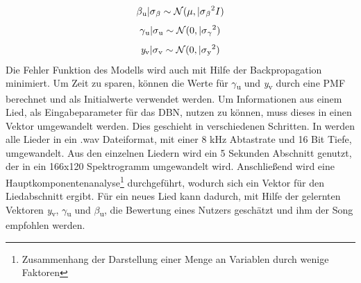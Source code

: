 \documentclass[twosided,a4,10pt]{article}
\begin{document}
\begin{multicols}{2}
		\begin{equation*}
		\centering
		\beta\textsubscript{u}|\sigma\textsubscript{$\beta$}\sim\mathcal{N}(\mu,|\sigma\textsubscript{$\beta$}\textsuperscript{2}I)
		\end{equation*}
		\begin{equation*}
		\centering
		\gamma\textsubscript{u}|\sigma\textsubscript{u}\sim\mathcal{N}(0,|\sigma\textsubscript{$\gamma$}\textsuperscript{2})
		\end{equation*}
		\begin{equation*}
		\centering
		\textit{y}\textsubscript{v}|\sigma\textsubscript{v}\sim\mathcal{N}(0,|\sigma\textsubscript{y}\textsuperscript{2})
		\end{equation*}\newline
		Die Fehler Funktion des Modells wird auch mit Hilfe der Backpropagation minimiert. Um Zeit zu sparen, können die Werte für $\gamma$\textsubscript{u} und \textit{y}\textsubscript{v} durch eine PMF berechnet und als Initialwerte verwendet werden.\newline
		Um Informationen aus einem Lied, als Eingabeparameter für das DBN, nutzen zu können, muss dieses in einen Vektor umgewandelt werden. Dies geschieht in verschiedenen Schritten. In \cite{wang} werden alle Lieder in ein .wav Dateiformat, mit einer 8 kHz Abtastrate und 16 Bit Tiefe, umgewandelt. Aus den einzelnen Liedern wird ein 5 Sekunden Abschnitt genutzt, der in ein 166x120 Spektrogramm umgewandelt wird. Anschließend wird eine Hauptkomponentenanalyse\footnote[21]{Zusammenhang der Darstellung einer Menge an Variablen durch wenige Faktoren} durchgeführt, wodurch sich ein Vektor für den Liedabschnitt ergibt. Für ein neues Lied kann dadurch, mit Hilfe der gelernten Vektoren \textit{y}\textsubscript{v}, $\gamma$\textsubscript{u} und $\beta$\textsubscript{u}, die Bewertung eines Nutzers geschätzt und ihm der Song empfohlen werden.\cite{wang}

\end{multicols}
\end{document}

